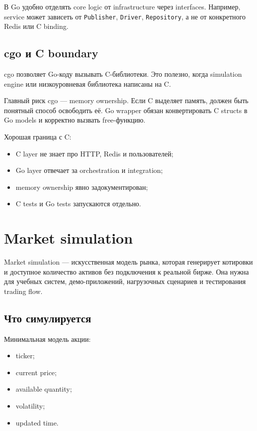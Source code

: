 \documentclass[12pt,a4paper]{article}
\begin{document}
В Go удобно отделять core logic от infrastructure через interfaces. Например,
service может зависеть от \texttt{Publisher}, \texttt{Driver}, \texttt{Repository},
а не от конкретного Redis или C binding.

\subsection{cgo и C boundary}

cgo позволяет Go-коду вызывать C-библиотеки. Это полезно, когда simulation engine
или низкоуровневая библиотека написаны на C.

Главный риск cgo --- memory ownership. Если C выделяет память, должен быть
понятный способ освободить её. Go wrapper обязан конвертировать C structs в Go
models и корректно вызвать free-функцию.

Хорошая граница с C:
\begin{itemize}
    \item C layer не знает про HTTP, Redis и пользователей;
    \item Go layer отвечает за orchestration и integration;
    \item memory ownership явно задокументирован;
    \item C tests и Go tests запускаются отдельно.
\end{itemize}

\newpage
\section{Market simulation}

Market simulation --- искусственная модель рынка, которая генерирует котировки и
доступное количество активов без подключения к реальной бирже. Она нужна для
учебных систем, демо-приложений, нагрузочных сценариев и тестирования trading flow.

\subsection{Что симулируется}

Минимальная модель акции:
\begin{itemize}
    \item ticker;
    \item current price;
    \item available quantity;
    \item volatility;
    \item updated time.
\end{itemize}
\end{document}
